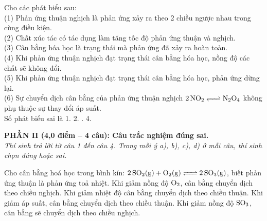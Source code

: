 \documentclass[12pt,a4paper]{article}
\begin{document}
\begin{ex}
Cho các phát biểu sau:\\
(1) Phản ứng thuận nghịch là phản ứng xảy ra theo 2 chiều ngược nhau trong cùng điều kiện.\\
(2) Chất xúc tác có tác dụng làm tăng tốc độ phản ứng thuận và nghịch.\\
(3) Cân bằng hóa học là trạng thái mà phản ứng đã xảy ra hoàn toàn.\\
(4) Khi phản ứng thuận nghịch đạt trạng thái cân bằng hóa học, nồng độ các chất sẽ không đổi.\\
(5) Khi phản ứng thuận nghịch đạt trạng thái cân bằng hóa học, phản ứng dừng lại.\\
(6) Sự chuyển dịch cân bằng của phản ứng thuận nghịch $\ce{2NO2 <=> N2O4}$ không phụ thuộc sự thay đổi áp suất.\\
Số phát biểu sai là
\choice
{1.}
{2.}
{.}
{4.}
\end{ex}


\bigskip
\noindent
\textbf{PHẦN II (4,0 điểm -- 4 câu): Câu trắc nghiệm đúng sai.}\\
\textit{Thí sinh trả lời từ câu 1 đến câu 4. Trong mỗi ý a), b), c), d) ở mỗi câu, thí sinh chọn đúng hoặc sai.}

\begin{ex}
Cho cân bằng hoá học trong bình kín: $\ce{2SO2(g) + O2(g) <=> 2SO3(g)}$, biết phản ứng thuận là phản ứng toả nhiệt.
\choiceTF
{\True Khi giảm nồng độ $\ce{O2}$, cân bằng chuyển dịch theo chiều nghịch.}
{\True Khi giảm nhiệt độ cân bằng chuyển dịch theo chiều thuận.}
{Khi giảm áp suất, cân bằng chuyển dịch theo chiều thuận.}
{Khi giảm nồng độ $\ce{SO3}$, cân bằng sẽ chuyển dịch theo chiều nghịch.}
\end{ex}
\end{document}
